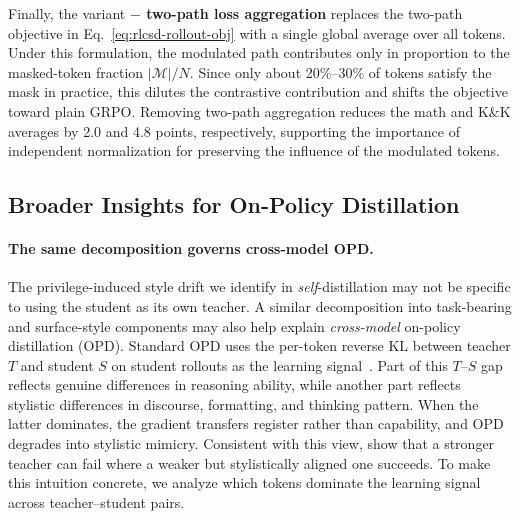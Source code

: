 Finally, the variant \textbf{$-$ two-path loss aggregation} replaces the two-path objective in Eq.~\ref{eq:rlcsd-rollout-obj} with a single global average over all tokens. Under this formulation, the modulated path contributes only in proportion to the masked-token fraction $|\mathcal{M}|/N$. Since only about 20\%--30\% of tokens satisfy the mask in practice, this dilutes the contrastive contribution and shifts the objective toward plain GRPO. Removing two-path aggregation reduces the math and K\&K averages by 2.0 and 4.8 points, respectively, supporting the importance of independent normalization for preserving the influence of the modulated tokens.


\subsection{Broader Insights for On-Policy Distillation}
\label{sec:exp-insights}

\paragraph{The same decomposition governs cross-model OPD.}
The privilege-induced style drift we identify in \emph{self}-distillation may not be specific to using the student as its own teacher. A similar decomposition into task-bearing and surface-style components may also help explain \emph{cross-model} on-policy distillation (OPD). Standard OPD uses the per-token reverse KL between teacher $T$ and student $S$ on student rollouts as the learning signal~\citep{thinkingmachines2025opd,agarwal2024policy}. Part of this $T$--$S$ gap reflects genuine differences in reasoning ability, while another part reflects stylistic differences in discourse, formatting, and thinking pattern. When the latter dominates, the gradient transfers register rather than capability, and OPD degrades into stylistic mimicry. Consistent with this view, \citet{li2026rethinking} show that a stronger teacher can fail where a weaker but stylistically aligned one succeeds. To make this intuition concrete, we analyze which tokens dominate the learning signal across teacher--student pairs.


